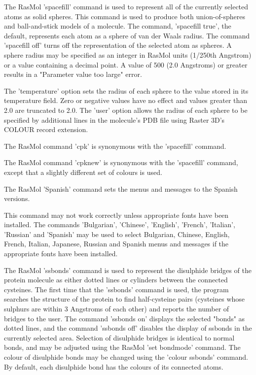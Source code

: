 The RasMol
'spacefill'
command is used to represent all of the currently selected atoms as solid
spheres. This command is used to produce both union-of-spheres and
ball-and-stick models of a molecule. The command,
'spacefill true',
the default, represents each atom as a sphere of van der Waals radius.
The command
'spacefill off'
turns off the representation of the selected atom as spheres. A sphere
radius may be specified as an integer in RasMol units (1/250th Angstrom)
or a value containing a decimal point. A value of 500 (2.0
Angstroms) or greater results in a "Parameter value too large" error.

The
'temperature'
option sets the radius of each sphere to the value stored in its temperature
field. Zero or negative values have no effect and values greater than
2.0 are truncated to 2.0.  The
'user'
option allows the radius of each sphere to be specified by additional lines
in the molecule's PDB file using Raster 3D's COLOUR record extension.

The RasMol command
'cpk'
is synonymous with the
'spacefill'
command.

The RasMol command
'cpknew'
is synonymous with the
'spacefill'
command, except that a slightly different set of colours is used.

The RasMol
'Spanish'
command sets the menus and messages to the Spanish versions.

This command may not work correctly unless appropriate fonts
have been installed.  The commands
'Bulgarian',
'Chinese',
'English',
'French',
'Italian',
'Russian'
and
'Spanish'
may be used to select Bulgarian, Chinese, English, French,
Italian, Japanese, Russian and Spanish menus and messages if the
appropriate fonts have been installed.

The RasMol
'ssbonds'
command is used to represent the disulphide bridges of the protein
molecule as either dotted lines or cylinders between the connected
cysteines. The first time that the
'ssbonds'
command is used, the program searches the structure of the protein to
find half-cysteine pairs (cysteines whose sulphurs are within 3 Angstroms
of each other) and reports the number of bridges to the user. The command
'ssbonds on'
displays the selected "bonds" as dotted lines, and the command
'ssbonds off'
disables the display of ssbonds in the currently selected area. Selection
of disulphide bridges is identical to normal bonds, and may be adjusted
using the RasMol
'set bondmode'
command. The colour of disulphide bonds may be changed using the
'colour ssbonds'
command. By default, each disulphide bond has the colours of its connected
atoms.

